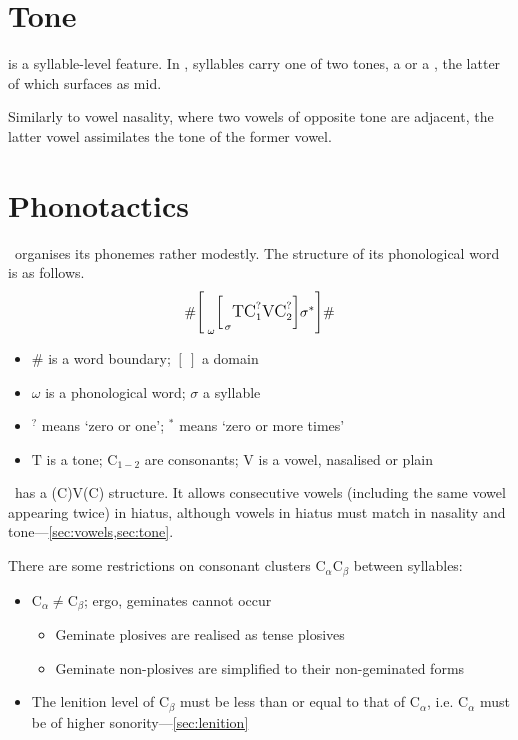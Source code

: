 \section{Tone}
\label{sec:tone}

 is a syllable-level feature. In \langname, syllables carry one of two tones,
a   or a  , the latter of which surfaces as mid.

Similarly to vowel nasality, where two vowels of opposite tone are adjacent,
the latter vowel assimilates the tone of the former vowel.

\section{Phonotactics}
\label{sec:phonotactics}

\langname~organises its phonemes rather modestly.
The structure of its phonological word is as follows.
\[
	\large
	\#
	\bigg[_{\hspace{0.2em}\omega}
	\Big[_{\hspace{0.1em}\sigma}
	\text{T} \text{C}_1^{?} \text{V} \text{C}_2^{?}
	\Big]
	\sigma^{*}
	\bigg]
	\#
\]

\begin{itemize}
	\item \(\#\) is a word boundary; \([\:]\) a domain
	\item \(\omega\) is a phonological word; \(\sigma\) a syllable
	\item \({}^{?}\) means `zero or one'; \({}^*\) means `zero or more times'
	\item \(\text{T}\) is a tone; \(\text{C}_{1-2}\) are consonants; \(\text{V}\) is a vowel, nasalised or plain
\end{itemize}

\langname~has a (C)V(C) structure. It allows consecutive vowels (including the same vowel appearing twice) in hiatus,
although vowels in hiatus must match in nasality and tone---\cref{sec:vowels,sec:tone}.

There are some restrictions on consonant clusters \(\text{C}_\alpha\text{C}_\beta\) between syllables:
\begin{itemize}
	\item \(\text{C}_\alpha \neq \text{C}_\beta\); ergo, geminates cannot occur
	      \begin{itemize}
		      \item Geminate plosives  are realised as tense plosives
		      \item Geminate non-plosives are simplified to their non-geminated forms
	      \end{itemize}
	\item The lenition level of \(\text{C}_\beta\) must be less than or equal to that of \(\text{C}_\alpha\), i.e. \(\text{C}_\alpha\) must be of higher sonority---\cref{sec:lenition}
\end{itemize}

